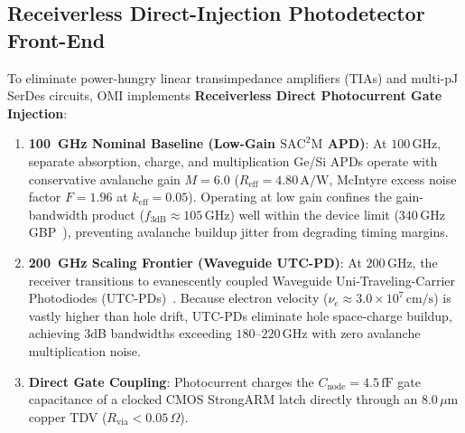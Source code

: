 \documentclass[journal]{IEEEtran}
\begin{document}
\subsection{Receiverless Direct-Injection Photodetector Front-End}
To eliminate power-hungry linear transimpedance amplifiers (TIAs) and multi-pJ SerDes circuits, OMI implements \textbf{Receiverless Direct Photocurrent Gate Injection}:
\begin{enumerate}
    \item \textbf{100~GHz Nominal Baseline (Low-Gain $\text{SAC}^2\text{M}$ APD)}: At $100\,\text{GHz}$, separate absorption, charge, and multiplication Ge/Si APDs operate with conservative avalanche gain $M = 6.0$ ($R_{\text{eff}} = 4.80\,\text{A/W}$, McIntyre excess noise factor $F = 1.96$ at $k_{\text{eff}} = 0.05$). Operating at low gain confines the gain-bandwidth product ($f_{3\text{dB}} \approx 105\,\text{GHz}$) well within the device limit ($340\,\text{GHz}$ GBP~\cite{kang2009monolithic}), preventing avalanche buildup jitter from degrading timing margins.
    \item \textbf{200~GHz Scaling Frontier (Waveguide UTC-PD)}: At $200\,\text{GHz}$, the receiver transitions to evanescently coupled Waveguide Uni-Traveling-Carrier Photodiodes (UTC-PDs)~\cite{ito2000high}. Because electron velocity ($\nu_e \approx 3.0 \times 10^7\,\text{cm/s}$) is vastly higher than hole drift, UTC-PDs eliminate hole space-charge buildup, achieving 3dB bandwidths exceeding $180\text{--}220\,\text{GHz}$ with zero avalanche multiplication noise.
    \item \textbf{Direct Gate Coupling}: Photocurrent charges the $C_{\text{node}} = 4.5\,\text{fF}$ gate capacitance of a clocked CMOS StrongARM latch directly through an $8.0\,\mu\text{m}$ copper TDV ($R_{\text{via}} < 0.05\,\Omega$).
\end{enumerate}
\end{document}
